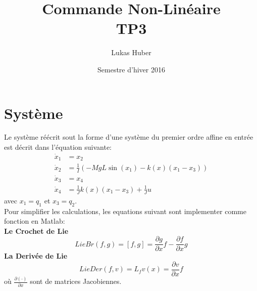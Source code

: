 \documentclass[a4paper,11pt]{article}
\title{Commande Non-Lin\'eaire \\ \small{TP3}}
\author{Lukas Huber}
\date{Semestre d'hiver 2016}
\begin{document}
     
\maketitle

\section{Syst\`eme}
Le syst\`eme r\'e\'ecrit sout la forme d'une syst\`eme du premier ordre affine en entr\'ee est d\'ecrit dans l'\'equation suivante:
\begin{align}
  \dot x_1 &=  x_2 \\
  \dot x_2 &= \frac{1}{I} (- M g L \sin(x_1) - k(x)(x_1 - x_3)) \\
  \dot x_3 &=  x_4 \\
  \dot x_4 &= \frac{1}{J}  k(x)(x_1 - x_3) + \frac{1}{J} u
\end{align}
avec $x_1 = q_1$ et $x_3 = q_2$. \\

Pour simplifier les calculations, les equations suivant sont implementer comme fonction en Matlab:\\
\textbf{Le Crochet de Lie}
\begin{equation}
  LieBr(f,g) = [f,g] = \frac{\partial g}{\partial x} f - \frac{\partial f}{\partial x}g
\end{equation}
\textbf{La Deriv\'ee de Lie}
\begin{equation}
  LieDer(f,v) = L_f v(x) =\frac{\partial v}{\partial x} f
\end{equation}
o\`u $\frac{\partial (\cdot)}{\partial x}$ sont de matrices Jacobiennes.\\
\end{document}
